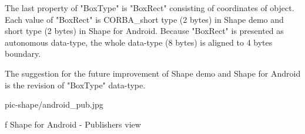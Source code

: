 The last property of "BoxType" is "BoxRect" consisting of coordinates of object. Each value of "BoxRect" is CORBA\_short type (2 bytes) in Shape demo and short type (2 bytes) in Shape for Android. Because "BoxRect" is presented as  autonomous data-type, the whole data-type (8 bytes) is aligned to 4 bytes boundary.

The suggestion for the future improvement of Shape demo and Shape for Android is the revision of "BoxType" data-type.

\midinsert
\picw=14cm \cinspic pic-shape/android_pub.jpg
\caption/f Shape for Android - Publishers view
\endinsert


